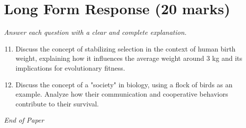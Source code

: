 \documentclass[12pt]{article}
\begin{document}
\section*{Long Form Response (20 marks)}
\textit{Answer each question with a clear and complete explanation.}
\begin{enumerate}[label=\arabic*.]
\setcounter{enumi}{10}
\item Discuss the concept of stabilizing selection in the context of human birth weight, explaining how it influences the average weight around 3 kg and its implications for evolutionary fitness.
\item Discuss the concept of a "society" in biology, using a flock of birds as an example. Analyze how their communication and cooperative behaviors contribute to their survival.
\end{enumerate}

\vfill
\noindent\textit{End of Paper}
\end{document}
